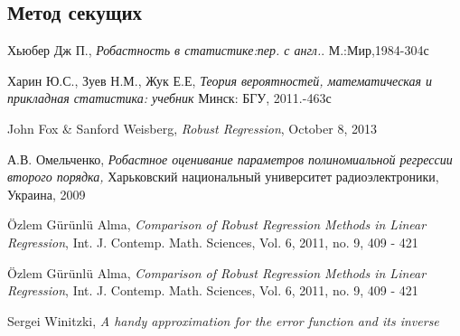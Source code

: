 \documentclass[12pt]{article}
\begin{document}
\subsection{Метод секущих}
\begin{thebibliography}{9}
    Хьюбер Дж П.,
    \textit{Робастность в статистике:пер. с англ.}.
    М.:Мир,1984-304с

    Харин Ю.С., Зуев Н.М.,
    Жук Е.Е,
    \textit{Теория вероятностей, математическая и прикладная статистика: учебник}
    Минск: БГУ, 2011.-463с

    John Fox \& Sanford Weisberg,
    \textit{Robust Regression},
    October 8, 2013

    А.В. Омельченко,
    \textit{Робастное оценивание параметров полиномиальной регрессии второго порядка,}
    Харьковский национальный университет радиоэлектроники, Украина, 2009

    \"{O}zlem G\"{u}r\"{u}nl\"{u} Alma,
    \textit{Comparison of Robust Regression Methods
    in Linear Regression},
    Int. J. Contemp. Math. Sciences, Vol. 6, 2011, no. 9, 409 - 421

    \"{O}zlem G\"{u}r\"{u}nl\"{u} Alma,
    \textit{Comparison of Robust Regression Methods
    in Linear Regression},
    Int. J. Contemp. Math. Sciences, Vol. 6, 2011, no. 9, 409 - 421

    Sergei Winitzki,
    \textit{A handy approximation for the error function and its inverse}
\end{thebibliography}
\end{document}
